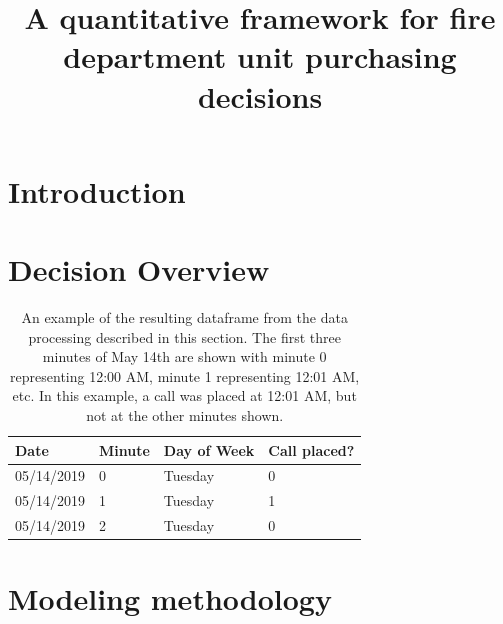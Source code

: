 \documentclass[article]{proc}
\begin{document}
\title{A quantitative framework for fire department unit purchasing decisions}
\address[1]{The University of Texas at Austin, Austin, TX, 78712, USA}

\maketitle



\section{Introduction}



\section{Decision Overview}



\begin{table}[h]
\centering
\caption{An example of the resulting dataframe from the data processing described in this section. The first three minutes of May 14th are shown with minute 0 representing 12:00 AM, minute 1 representing 12:01 AM, etc. In this example, a call was placed at 12:01 AM, but not at the other minutes shown.}
\begin{tabular}{|l|l|l|l|}
\hline
\textbf{Date} & \textbf{Minute} & \textbf{Day of Week} & \textbf{Call placed?} \\ \hline
05/14/2019    & 0               & Tuesday              & 0                     \\ \hline
05/14/2019    & 1               & Tuesday              & 1                     \\ \hline
05/14/2019    & 2               & Tuesday              & 0                     \\ \hline
\end{tabular}
\label{minutedf}
\end{table}






\section{Modeling methodology}
\end{document}
